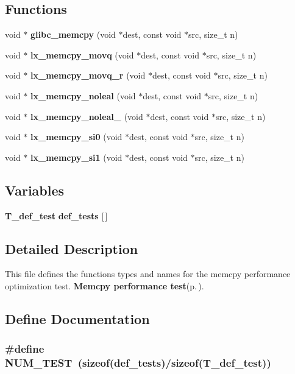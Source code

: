 \subsection*{Functions}
\begin{CompactItemize}
\item 
void $\ast$ {\bf glibc\_\-memcpy} (void $\ast$dest, const void $\ast$src, size\_\-t n)
\item 
void $\ast$ {\bf lx\_\-memcpy\_\-movq} (void $\ast$dest, const void $\ast$src, size\_\-t n)
\item 
void $\ast$ {\bf lx\_\-memcpy\_\-movq\_\-r} (void $\ast$dest, const void $\ast$src, size\_\-t n)
\item 
void $\ast$ {\bf lx\_\-memcpy\_\-noleal} (void $\ast$dest, const void $\ast$src, size\_\-t n)
\item 
void $\ast$ {\bf lx\_\-memcpy\_\-noleal\_} (void $\ast$dest, const void $\ast$src, size\_\-t n)
\item 
void $\ast$ {\bf lx\_\-memcpy\_\-si0} (void $\ast$dest, const void $\ast$src, size\_\-t n)
\item 
void $\ast$ {\bf lx\_\-memcpy\_\-si1} (void $\ast$dest, const void $\ast$src, size\_\-t n)
\end{CompactItemize}
\subsection*{Variables}
\begin{CompactItemize}
\item 
{\bf T\_\-def\_\-test} {\bf def\_\-tests} [$\,$]
\end{CompactItemize}


\subsection{Detailed Description}
This file defines the functions types and names for the memcpy performance optimization test. {\bf Memcpy performance test}{\rm (p.\,\pageref{group__memcpy__test})}. 



\subsection{Define Documentation}
\subsubsection{\setlength{\rightskip}{0pt plus 5cm}\#define NUM\_\-TEST\ (sizeof({\bf def\_\-tests})/sizeof({\bf T\_\-def\_\-test}))}\label{memcpy_2def__test_8h_a0}


